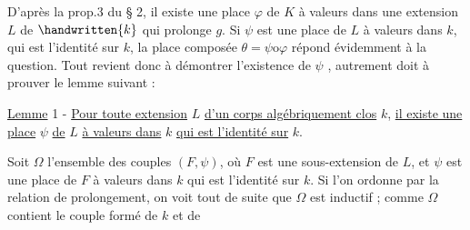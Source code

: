 D'après la prop.3 du § 2, il existe une place $\varphi$ de $K$ à valeurs dans une extension $L$ de $\handwritten{k}$ qui prolonge $g$. Si $\psi$ est une place de $L$ à valeurs dans $k$, qui est l'identité sur $k$, la place composée $\theta=\psi\mathbin{\mathrm{o}}\varphi$ répond évidemment à la question. Tout revient donc à démontrer l'existence de $\psi$ , autrement doit à prouver le lemme suivant :

\uline{Lemme} 1 - \uline{Pour toute extension} $L$ \uline{d'un corps algébriquement clos} $k$, \uline{il existe une place} $\psi$ \uline{de} $L$ \uline{à valeurs dans} $k$ \uline{qui est l'identité sur} $k$.

Soit $\Omega$ l'ensemble des couples $(F,\psi)$, où $F$ est une sous-extension de $L$, et $\psi$ est une place de $F$ à valeurs dans $k$ qui est l'identité sur $k$. Si l'on ordonne \handwritten{\inserted{$\Omega$}} par la relation de prolongement, on voit tout de suite que $\Omega$ est inductif ; comme $\Omega$ contient le couple formé de $k$ et de

